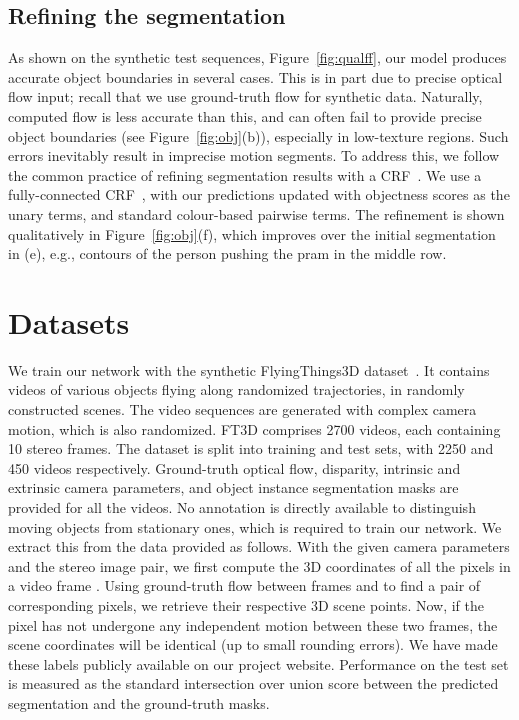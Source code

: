 \documentclass[10pt,twocolumn,letterpaper]{article}
\begin{document}
\vspace{-0.05cm}
\subsection{Refining the segmentation}
\label{sec:crf}
\vspace{-0.15cm}
As shown on the synthetic test sequences, Figure~\ref{fig:qualff}, our model
produces accurate object boundaries in several cases. This is in part due to
precise optical flow input; recall that we use ground-truth flow for synthetic
data. Naturally, computed flow is less accurate than this, and can often fail
to provide precise object boundaries (see Figure~\ref{fig:obj}(b)),
especially in low-texture regions. Such errors inevitably result in imprecise
motion segments. To address this, we follow the common practice of refining
segmentation results with a CRF~\cite{chen2014semantic}. We use a
fully-connected CRF~\cite{krahenbuhl2011efficient}, with our predictions
updated with objectness scores as the unary terms, and standard colour-based
pairwise terms. The refinement is shown qualitatively in
Figure~\ref{fig:obj}(f), which improves over the initial segmentation in (e),
e.g., contours of the person pushing the pram in the middle row.

\section{Datasets}
\label{sec:datasets}
\vspace{-0.2cm}
 We train our network with the synthetic
FlyingThings3D dataset~\cite{Mayer16}. It contains videos of various objects
flying along randomized trajectories, in randomly constructed scenes. The video
sequences are generated with complex camera motion, which is also randomized.
FT3D comprises 2700 videos, each containing 10 stereo frames. The dataset is
split into training and test sets, with 2250 and 450 videos respectively.
Ground-truth optical flow, disparity, intrinsic and extrinsic camera
parameters, and object instance segmentation masks are provided for all the
videos. No annotation is directly available to distinguish moving objects from
stationary ones, which is required to train our network. We extract this from
the data provided as follows. With the given camera parameters and the stereo
image pair, we first compute the 3D coordinates of all the pixels in a video
frame . Using ground-truth flow between frames  and  to find a pair
of corresponding pixels, we retrieve their respective 3D scene points. Now, if
the pixel has not undergone any independent motion between these two frames,
the scene coordinates will be identical (up to small rounding errors). We have
made these labels publicly available on our project website. Performance on the
test set is measured as the standard intersection over union score between the
predicted segmentation and the ground-truth masks.
\end{document}
